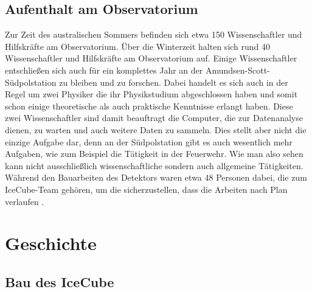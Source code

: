     \subsection{Aufenthalt am Observatorium}

    Zur Zeit des australischen Sommers befinden sich etwa 150 Wissenschaftler und 
    Hilfskräfte am Observatorium. Über die Winterzeit halten sich rund 40 Wissenschaftler 
    und Hilfskräfte am Observatorium auf. Einige Wissenschaftler entschließen sich auch 
    für ein komplettes Jahr an der Amundsen-Scott-Südpolstation zu bleiben und zu forschen. 
    Dabei handelt es sich auch in der Regel um zwei Physiker die ihr Physikstudium 
    abgeschlossen haben und somit schon einige theoretische als auch praktische Kenntnisse 
    erlangt haben. Diese zwei Wissenschaftler sind damit  beauftragt die Computer, die zur 
    Datenanalyse dienen, zu warten und auch weitere Daten zu sammeln. Dies stellt aber nicht 
    die einzige Aufgabe dar, denn an der Südpolstation gibt es auch wesentlich mehr Aufgaben, 
    wie zum Beispiel die Tätigkeit in der Feuerwehr. Wie man also sehen kann nicht 
    ausschließlich wissenschaftliche sondern auch allgemeine Tätigkeiten. Während den 
    Bauarbeiten des Detektors waren etwa 48 Personen dabei, die zum IceCube-Team gehören, 
    um die sicherzustellen, dass die Arbeiten nach Plan verlaufen \cite{FAQ13}.

    \section{Geschichte}

    \subsection{Bau des IceCube}

